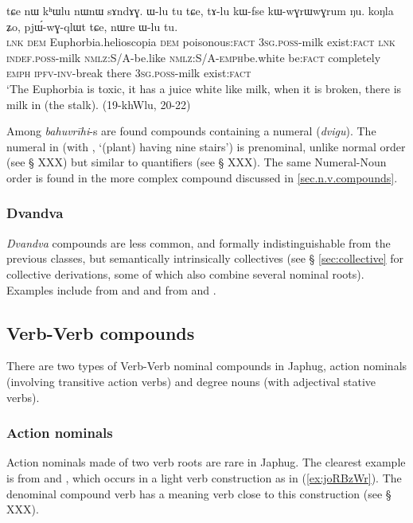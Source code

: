 \begin{exe}
\ex \label{ex:khWlu}  
\gll tɕe nɯ kʰɯlu nɯnɯ sɤndɤɣ. ɯ-lu tu tɕe, tɤ-lu kɯ-fse kɯ-wɣrɯ\redp{}wɣrum ŋu. koŋla ʑo, pjɯ́-wɣ-qlɯt tɕe, nɯre ɯ-lu tu. \\
\textsc{lnk} \textsc{dem} Euphorbia.helioscopia \textsc{dem} poisonous:\textsc{fact} \textsc{3sg.poss}-milk exist:\textsc{fact} \textsc{lnk}  \textsc{indef.poss}-milk \textsc{nmlz}:S/A-be.like \textsc{nmlz}:S/A-\textsc{emph}\redp{}be.white be:\textsc{fact} completely \textsc{emph} \textsc{ipfv}-\textsc{inv}-break there \textsc{3sg.poss}-milk exist:\textsc{fact} \\
\glt `The Euphorbia is toxic, it has a juice white like milk, when it is broken, there is milk in (the stalk). (19-khWlu, 20-22)
\end{exe}
Among \textit{bahuvrīhi}-s are found compounds containing a numeral (\textit{dvigu}). The numeral  in  (with , `(plant) having nine stairs') is prenominal, unlike normal order (see § XXX) but similar to quantifiers (see § XXX). The same Numeral-Noun order is found in the more complex compound  discussed in \ref{sec.n.v.compounds}.

\subsubsection{Dvandva} \label{sec:dvandva.n.n}
\textit{Dvandva} compounds are less common, and formally indistinguishable from the previous classes, but semantically intrinsically collectives (see § \ref{sec:collective} for collective derivations, some of which also combine several nominal roots). Examples include  from  and  and  from  and . 


\subsection{Verb-Verb compounds} \label{sec.v.v.compounds}
There are two types of Verb-Verb nominal compounds in Japhug, action nominals (involving transitive action verbs) and degree nouns (with adjectival stative verbs).

\subsubsection{Action nominals} \label{sec.v.v.compounds.action}
Action nominals made of two verb roots are rare in Japhug. The clearest example is  from    and , which occurs in a light verb construction as in (\ref{ex:joRBzWr}). The denominal compound verb   has a meaning verb close to this construction (see § XXX).


